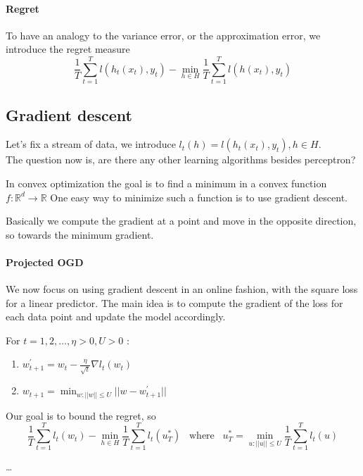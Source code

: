 \paragraph{Regret}
To have an analogy to the variance error, or the approximation error, 
we introduce the regret measure
$$\frac{1}{T}\sum_{t=1}^T l(h_t(x_t), y_t) - \min_{h\in H}\frac{1}{T}\sum_{t=1}^T l(h(x_t), y_t)$$

\subsection{Gradient descent}
Let's fix a stream of data, we introduce $l_t(h) = l(h_t(x_t), y_t), h\in H$.\\
The question now is, are there any other learning algorithms 
besides perceptron?

In convex optimization the goal is to find a minimum in a convex 
function $f : \mathbb{R}^d \rightarrow \mathbb{R}$
One easy way to minimize such a function is to use gradient descent.

Basically we compute the gradient at a point and move in the opposite direction, 
so towards the minimum gradient.

\paragraph{Projected OGD}
We now focus on using gradient descent in an online fashion, 
with the square loss for a linear predictor.
The main idea is to compute the gradient of the loss 
for each data point and update the model accordingly.

For $t = 1, 2, \dots, \eta > 0, U > 0$ :
\begin{enumerate}
    \item $w^\prime_{t+1} = w_t - \frac{\eta}{\sqrt{t}}\nabla l_t(w_t)$
    \item $w_{t+1} = \min_{w : ||w||\leq U} ||w- w^\prime_{t+1} || $
\end{enumerate}
Our goal is to bound the regret, so 
$$\frac{1}{T}\sum_{t=1}^T l_t(w_t) - \min_{h\in H}\frac{1}{T}\sum_{t=1}^T l_t(u^*_T)\;\;\;
\text{where}\;\;\;
u^*_T = \min_{u : ||u|| \leq U}\frac{1}{T}\sum_{t=1}^T l_t(u)$$

\dots